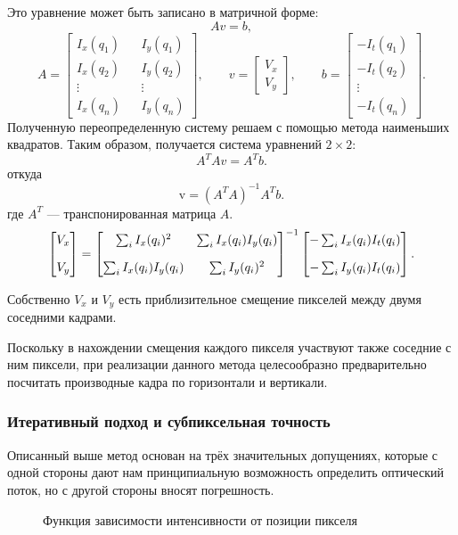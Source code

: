 Это уравнение может быть записано в матричной форме:
$$A v = b,$$
$$A = \begin{bmatrix}
I_x(q_1) && I_y(q_1) \\
I_x(q_2) && I_y(q_2) \\
\vdots && \vdots \\
I_x(q_n) && I_y(q_n)
\end{bmatrix},
\quad\quad
v =
\begin{bmatrix}
V_x\\
V_y
\end{bmatrix},
\quad\quad
b =
\begin{bmatrix}
-I_t(q_1)\\
-I_t(q_2)\\
\vdots \\
-I_t(q_n)
\end{bmatrix}.$$
Полученную переопределенную систему решаем с помощью метода наименьших квадратов. Таким образом, получается система уравнений $2 \times 2$:
$$A^T A v=A^T b.$$
откуда
$$\mathrm{v}=(A^T A)^{-1}A^T b.$$
где $A^T$ — транспонированная матрица $A$.
\begin{equation}
\numberwithin{equation}{section}
\label{eq:lucas}
\begin{bmatrix} V_x\\[10pt] V_y \end{bmatrix} = \begin{bmatrix} \sum_i I_x(q_i)^2 & \sum_i I_x(q_i)I_y(q_i) \\[10pt] \sum_i I_x(q_i)I_y(q_i) & \sum_i I_y(q_i)^2 \end{bmatrix}^{-1} \begin{bmatrix} -\sum_i I_x(q_i)I_t(q_i) \\[10pt] -\sum_i I_y(q_i)I_t(q_i) \end{bmatrix}.
\end{equation}

Собственно $V_x$ и $V_y$ есть приблизительное смещение пикселей между двумя соседними кадрами.

Поскольку в нахождении смещения каждого пикселя участвуют также соседние с ним пиксели, при реализации данного метода целесообразно предварительно посчитать производные кадра по горизонтали и вертикали.
\subsubsection{Итеративный подход и субпиксельная точность} %

Описанный выше метод основан на трёх значительных допущениях, которые с одной стороны дают нам принципиальную возможность определить оптический поток, но с другой стороны вносят погрешность. 
\begin{figure}[ht]
\caption{Функция зависимости интенсивности от позиции пикселя}
\label{pic:math_3}
\end{figure}

